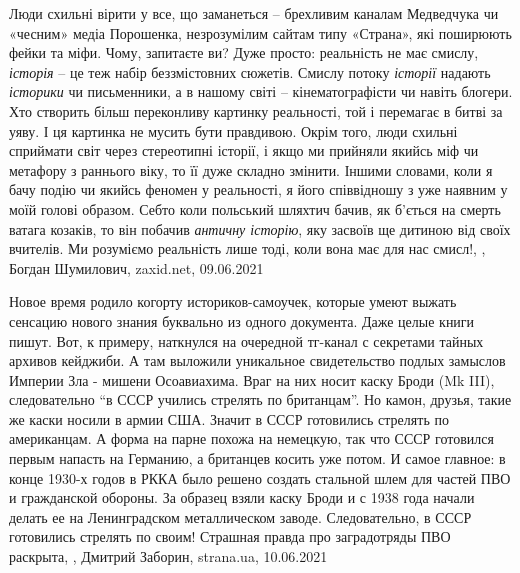 Люди схильні вірити у все, що заманеться – брехливим каналам Медведчука чи
«чесним» медіа Порошенка, незрозумілим сайтам типу «Страна», які поширюють
фейки та міфи. Чому, запитаєте ви? Дуже просто: реальність не має смислу,
\emph{історія} – це теж набір беззмістовних сюжетів. Смислу потоку \emph{історії} надають
\emph{історики} чи письменники, а в нашому світі – кінематографісти чи навіть блогери.
Хто створить більш переконливу картинку реальності, той і перемагає в битві за
уяву. І ця картинка не мусить бути правдивою. Окрім того, люди схильні
сприймати світ через стереотипні історії, і якщо ми прийняли якийсь міф чи
метафору з раннього віку, то її дуже складно змінити. Іншими словами, коли я
бачу подію чи якийсь феномен у реальності, я його співвідношу з уже наявним у
моїй голові образом. Себто коли польський шляхтич бачив, як б'ється на смерть
ватага козаків, то він побачив \emph{античну історію}, яку засвоїв ще дитиною від
своїх вчителів. Ми розуміємо реальність лише тоді, коли вона має для нас смисл!,
, Богдан Шумилович, zaxid.net, 09.06.2021

Новое время родило когорту историков-самоучек, которые умеют выжать сенсацию
нового знания буквально из одного документа. Даже целые книги пишут. Вот, к
примеру, наткнулся на очередной тг-канал с секретами тайных архивов кейджиби. А
там выложили уникальное свидетельство подлых замыслов Империи Зла - мишени
Осоавиахима. Враг на них носит каску Броди (Mk III), следовательно \enquote{в СССР
учились стрелять по британцам}. Но камон, друзья, такие же каски носили в
армии США. Значит в СССР готовились стрелять по американцам. А форма на парне
похожа на немецкую, так что СССР готовился первым напасть на Германию, а
британцев косить уже потом. И самое главное: в конце 1930-х годов в РККА было
решено создать стальной шлем для частей ПВО и гражданской обороны. За образец
взяли каску Броди и с 1938 года начали делать ее на Ленинградском металлическом
заводе.  Следовательно, в СССР готовились стрелять по своим! Страшная правда
про заградотряды ПВО раскрыта,
, Дмитрий Заборин, strana.ua, 10.06.2021

